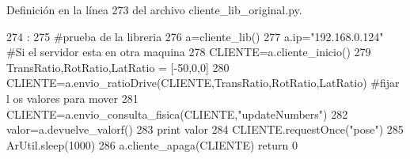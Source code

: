 Definición en la línea 273 del archivo cliente\_\-lib\_\-original.py.


\begin{DoxyCode}
274           :
275         #prueba de la libreria
276         a=cliente_lib()
277         a.ip="192.168.0.124" #Si el servidor esta en otra maquina 
278         CLIENTE=a.cliente_inicio()
279         TransRatio,RotRatio,LatRatio = [-50,0,0]
280         CLIENTE=a.envio_ratioDrive(CLIENTE,TransRatio,RotRatio,LatRatio) #fijar l
      os valores para mover
281         CLIENTE=a.envio_consulta_fisica(CLIENTE,"updateNumbers")
282         valor=a.devuelve_valorf()
283         print valor
284         CLIENTE.requestOnce("pose")
285         ArUtil.sleep(1000)
286         a.cliente_apaga(CLIENTE)
        return 0
\end{DoxyCode}
